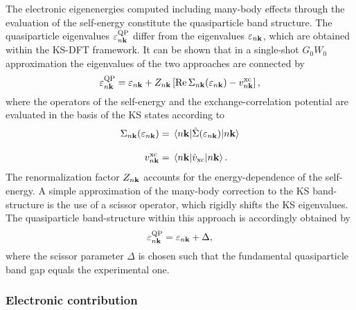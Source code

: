 The electronic eigenenergies computed including many-body effects through the evaluation of the self-energy constitute the quasiparticle band structure. The quasiparticle eigenvalues $\varepsilon^\text{QP}_{n\mathbf{k}}$ differ from the eigenvalues $\varepsilon_{n\mathbf{k}}$, which are obtained within the KS-DFT framework. It can  be shown\cite{hybertsen1986electron} that in a single-shot $G_0W_0$ approximation the eigenvalues of the two approaches are connected by
%
\begin{equation}
    \varepsilon^\text{QP}_{n\mathbf{k}} = \varepsilon_{n\mathbf{k}} + Z_{n\mathbf{k}}\left[\Re \Sigma_{n\mathbf{k}}(\varepsilon_{n\mathbf{k}}) - v^\text{xc}_{n\mathbf{k}}  \right],
\end{equation}
%
where the operators of the self-energy and the exchange-correlation potential are evaluated in the basis of the KS states according to
%
\begin{align}
   \Sigma_{n\mathbf{k}}(\varepsilon_{n\mathbf{k}}) & =\mel{n\mathbf{k}}{\hat{\Sigma}(\varepsilon_{n\mathbf{k}})}{n\mathbf{k}}\\[10pt]
   v^\text{xc}_{n\mathbf{k}} & = \mel{n\mathbf{k}}{\hat{v}_\text{xc}}{n\mathbf{k}}.
\end{align}
%
The renormalization factor $Z_{n\mathbf{k}}$ accounts for the energy-dependence of the self-energy. A simple approximation of the many-body correction to the KS band-structure is the use of a scissor operator, which rigidly shifts the KS eigenvalues. The quasiparticle band-structure within this approach is accordingly obtained by
\begin{equation}
    \varepsilon^\text{QP}_{n\mathbf{k}} = \varepsilon_{n\mathbf{k}} + \Delta,
\end{equation}
% 
where the scissor parameter $\Delta$ is chosen such that the fundamental quasiparticle band gap equals the experimental one.
%
\vfill%
\subsubsection{Electronic contribution}\label{selfen_el}

